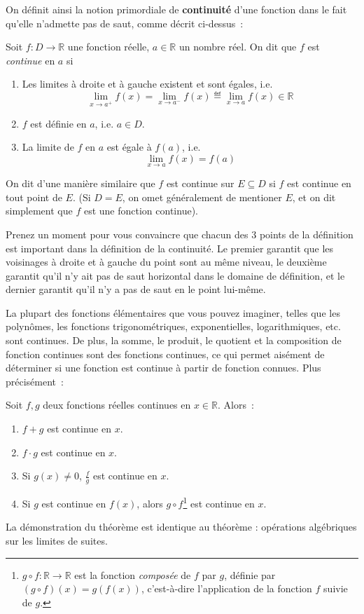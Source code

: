 On définit ainsi la notion primordiale de \textbf{continuité} d'une fonction dans le fait qu'elle n'admette pas de saut, comme décrit ci-dessus~:
\begin{boxdef}[Continuité]\label{def:continuité}
Soit $f : D \to \mathbb{R}$ une fonction réelle, $a \in \mathbb{R}$ un nombre réel. On dit que $f$ est \emph{continue} en $a$ si
\begin{enumerate}
    \item Les limites à droite et à gauche existent et sont égales, i.e.
    \begin{equation}
    \lim_{x \to a^+} f(x) = \lim_{x \to a^-} f(x) \eqdef \lim_{x \to a} f(x) \in \mathbb{R}
    \end{equation}
    
    \item $f$ est définie en $a$, i.e. $a \in D$.
    
    \item La limite de $f$ en $a$ est égale à $f(a)$, i.e.
    \begin{equation}
    \lim_{x \to a} f(x) = f(a)
    \end{equation}
\end{enumerate}
On dit d'une manière similaire que $f$ est continue sur $E \subseteq D$ si $f$ est continue en tout point de $E$. (Si $D = E$, on omet généralement de mentioner $E$, et on dit simplement que $f$ est une fonction continue).
\end{boxdef}
Prenez un moment pour vous convaincre que chacun des 3 points de la définition est important dans la définition de la continuité. Le premier garantit que les voisinages à droite et à gauche du point sont au même niveau, le deuxième garantit qu'il n'y ait pas de saut horizontal dans le domaine de définition, et le dernier garantit qu'il n'y a pas de saut en le point lui-même.

La plupart des fonctions élémentaires que vous pouvez imaginer, telles que les polynômes, les fonctions trigonométriques, exponentielles, logarithmiques, etc. sont continues. De plus, la somme, le produit, le quotient et la composition de fonction continues sont des fonctions continues, ce qui permet aisément de déterminer si une fonction est continue à partir de fonction connues. Plus précisément~:
\begin{boxthm}
Soit $f, g$ deux fonctions réelles continues en $x \in \mathbb{R}$. Alors~:
\begin{enumerate}
    \item $f + g$ est continue en $x$.
    \item $f \cdot g$ est continue en $x$.
    \item Si $g(x) \neq 0$, $\frac{f}{g}$ est continue en $x$.
    \item Si $g$ est continue en $f(x)$, alors $g \circ f$\footnote{$g \circ f : \mathbb{R} \to \mathbb{R}$ est la fonction \emph{composée} de $f$ par $g$, définie par $(g \circ f)(x) = g(f(x))$, c'est-à-dire l'application de la fonction $f$ suivie de $g$.} est continue en $x$.
\end{enumerate}
\end{boxthm}
La démonstration du théorème est identique au théorème : opérations algébriques sur les limites de suites.
